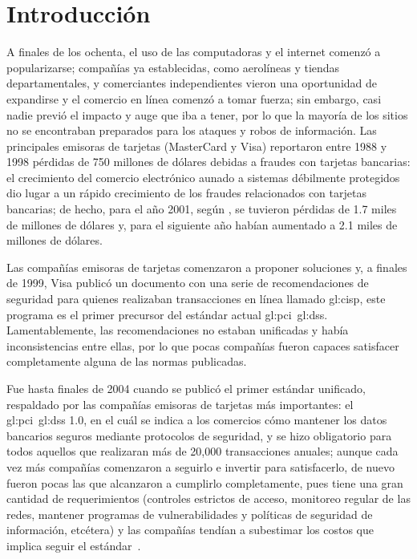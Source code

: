 %
%
%

\chapter{Introducción}

A finales de los ochenta, el uso de las computadoras y el internet comenzó a
popularizarse; compañías ya establecidas, como aerolíneas y tiendas
departamentales, y comerciantes independientes vieron una oportunidad de
expandirse y el comercio en línea comenzó a tomar fuerza; sin embargo, casi
nadie previó el impacto y auge que iba a tener, por lo que la mayoría de los
sitios no se encontraban preparados para los ataques y robos de información.
Las principales emisoras de tarjetas (MasterCard y Visa) reportaron entre 1988 y
1998 pérdidas de 750 millones de dólares debidas a fraudes con
tarjetas bancarias: el crecimiento del comercio electrónico aunado a
sistemas débilmente protegidos dio lugar a un rápido crecimiento de los
fraudes relacionados con tarjetas bancarias; de hecho, para el año 2001,
según \cite{wallethub}, se tuvieron pérdidas de 1.7 miles de millones de
dólares y, para el siguiente año habían aumentado a 2.1 miles de millones de
dólares.

Las compañías emisoras de tarjetas comenzaron a proponer soluciones y,
a finales de 1999, Visa publicó un documento con una serie de recomendaciones
de seguridad para quienes realizaban transacciones en línea llamado
\gls{gl:cisp}, este programa es el primer precursor del estándar actual
\gls{gl:pci}~\gls{gl:dss}. Lamentablemente, las recomendaciones no estaban
unificadas y había inconsistencias entre ellas, por lo que pocas compañías
fueron capaces satisfacer completamente alguna de las normas publicadas.

Fue hasta finales de 2004 cuando se publicó el primer estándar unificado,
respaldado por las compañías emisoras de tarjetas más importantes: el
\gls{gl:pci}~\gls{gl:dss} 1.0, en el cuál se indica a los comercios cómo
mantener los datos bancarios seguros mediante protocolos de seguridad, y se hizo
obligatorio para todos aquellos que realizaran más de 20,000 transacciones
anuales; aunque cada vez más compañías comenzaron a seguirlo e invertir para
satisfacerlo, de nuevo fueron pocas las que alcanzaron a cumplirlo
completamente, pues tiene una gran cantidad de requerimientos (controles
estrictos de acceso, monitoreo regular de las redes, mantener programas de
vulnerabilidades y políticas de seguridad de información, etcétera) y las
compañías tendían a subestimar los costos que implica seguir el
estándar~\cite{uk_association, search_security}.


